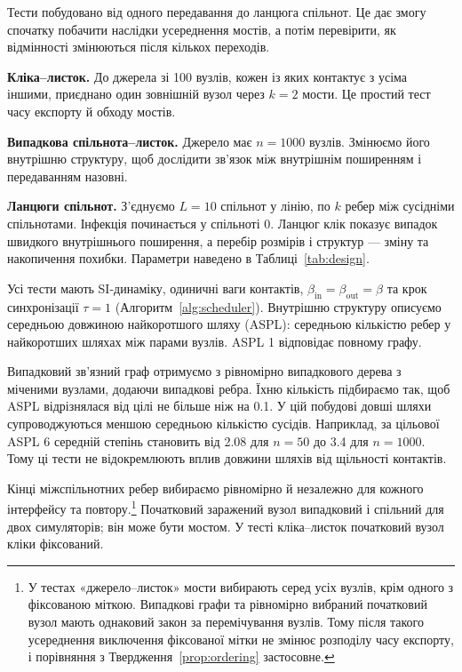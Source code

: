 Тести побудовано від одного передавання до ланцюга спільнот. Це дає змогу спочатку побачити наслідки усереднення мостів, а потім перевірити, як відмінності змінюються після кількох переходів.
\par \textbf{Кліка--листок.} До джерела зі 100 вузлів, кожен із яких контактує з усіма іншими, приєднано один зовнішній вузол через $k=2$ мости. Це простий тест часу експорту й обходу мостів.
\par \textbf{Випадкова спільнота--листок.} Джерело має $n=1000$ вузлів. Змінюємо його внутрішню структуру, щоб дослідити зв'язок між внутрішнім поширенням і передаванням назовні.
\par \textbf{Ланцюги спільнот.} З'єднуємо $L=10$ спільнот у лінію, по $k$ ребер між сусідніми спільнотами. Інфекція починається у спільноті 0. Ланцюг клік показує випадок швидкого внутрішнього поширення, а перебір розмірів і структур --- зміну та накопичення похибки. Параметри наведено в Таблиці~\ref{tab:design}.
\par Усі тести мають SI-динаміку, одиничні ваги контактів, $\beta_{\mathrm{in}}=\beta_{\mathrm{out}}=\beta$ та крок синхронізації $\tau=1$ (Алгоритм~\ref{alg:scheduler}). Внутрішню структуру описуємо середньою довжиною найкоротшого шляху (ASPL): середньою кількістю ребер у найкоротших шляхах між парами вузлів. ASPL 1 відповідає повному графу.
\par Випадковий зв'язний граф отримуємо з рівномірно випадкового дерева з міченими вузлами, додаючи випадкові ребра. Їхню кількість підбираємо так, щоб ASPL відрізнялася від цілі не більше ніж на 0.1. У цій побудові довші шляхи супроводжуються меншою середньою кількістю сусідів. Наприклад, за цільової ASPL 6 середній степінь становить від 2.08 для $n=50$ до 3.4 для $n=1000$. Тому ці тести не відокремлюють вплив довжини шляхів від щільності контактів.
\par Кінці міжспільнотних ребер вибираємо рівномірно й незалежно для кожного інтерфейсу та повтору.\footnote{У тестах «джерело--листок» мости вибирають серед усіх вузлів, крім одного з фіксованою міткою. Випадкові графи та рівномірно вибраний початковий вузол мають однаковий закон за перемічування вузлів. Тому після такого усереднення виключення фіксованої мітки не змінює розподілу часу експорту, і порівняння з Твердження~\ref{prop:ordering} застосовне.} Початковий заражений вузол випадковий і спільний для двох симуляторів; він може бути мостом. У тесті кліка--листок початковий вузол кліки фіксований.

